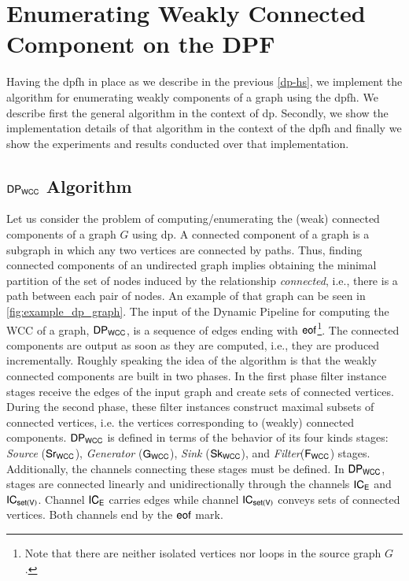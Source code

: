 \section{Enumerating Weakly Connected Component on the DPF}\label{sec:wcc-dpf}

Having the \acrshort{dpfh} in place as we describe in the previous \autoref{dp-hs}, we implement the algorithm for enumerating weakly components of a graph using the \acrshort{dpfh}.
We describe first the general algorithm in the context of \acrshort{dp}.
Secondly, we show the implementation details of that algorithm in the context of the \acrshort{dpfh} and finally we show the experiments and results conducted over that implementation.

\iffalse
\subsection{\texorpdfstring{$\mathsf{DP_{WCC}}$}{Lg} Algorithm}\label{sub:sec:wcc:algo}
Let us consider the problem of computing/enumerating the (weak) connected components of a graph $G$ using \acrshort{dp}. 
A connected component of a graph is a subgraph in which any two vertices are connected by paths.  
Thus, finding connected components of an undirected graph implies obtaining the minimal partition of the set of nodes induced by the relationship \textit{connected}, i.e., there is a path between each pair of nodes. 
An example of that graph can be seen in \autoref{fig:example_dp_graph}.
The input of the Dynamic Pipeline for computing the WCC of a graph, $\mathsf{DP_{WCC}}$, is a sequence of edges ending with $\mathsf{eof}$\footnote{Note that there are neither isolated vertices nor loops in the source graph $G$.}. 
The connected components are output as soon as they are computed, i.e., they are produced incrementally. 
Roughly speaking the idea of the algorithm is that the weakly connected components are built in two phases. 
In the first phase filter instance stages receive the edges of the input graph and create sets of connected vertices. 
During the second phase, these filter instances construct maximal subsets of connected vertices, i.e. the vertices corresponding to (weakly) connected components.
%
$\mathsf{DP_{WCC}}$ is defined in terms of the behavior of its four kinds stages: \textit{Source} ($\mathsf{Sr_{WCC}}$),  \textit{Generator} ($\mathsf{G_{WCC}}$),  \textit{Sink} ($\mathsf{Sk_{WCC}}$), and \textit{Filter}($\mathsf{F_{WCC}}$) stages. Additionally,  the channels connecting these stages must be defined. 
In $\mathsf{DP_{WCC}}$, stages are connected linearly and unidirectionally through the channels $\mathsf{IC_E}$ and  $\mathsf{IC_{set(V)}}$. Channel $\mathsf{IC_E}$ carries edges while channel  $\mathsf{IC_{set(V)}}$ conveys sets of connected vertices. Both channels end by the $\mathsf{eof}$ mark. 
